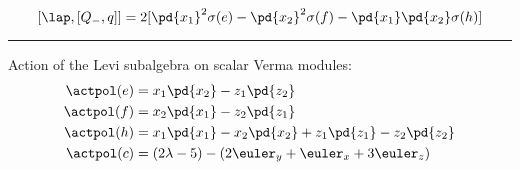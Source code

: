 \[
    [\lap, [Q_-,q]] = 2[\pd{x_1}^2\sigma(e) - \pd{x_2}^2\sigma(f) - \pd{x_1}\pd{x_2}\sigma(h)]
\]

\bigskip
\hrule
\bigskip

Action of the Levi subalgebra on scalar Verma modules:
\begin{align}
    \actpol(e) &= x_1 \pd{x_2} - z_1 \pd{z_2} \\
    \actpol(f) &= x_2 \pd{x_1} - z_2 \pd{z_1} \\
    \actpol(h) &= x_1 \pd{x_1} - x_2 \pd{x_2} + z_1 \pd{z_1} - z_2 \pd{z_2} \\
    \actpol(c) &= (2\lambda -5) - (2 \euler_y + \euler_x + 3 \euler_z)
\end{align}


